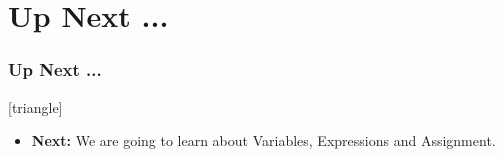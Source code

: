 \documentclass[fleqn]{beamer} %
\newcommand{\sectiontitleV}{Up Next ...}
\begin{document}
\section{\sectiontitleV}	
	\begin{frame}[label=sectionV] \small
		\frametitle{\sectiontitleV}    
	
 			[triangle]
            \begin{itemize}

                \item {\bf Next:} We are going to learn about Variables, Expressions and Assignment. \vspc

			
                
            \end{itemize}
	\end{frame}
\end{document}
